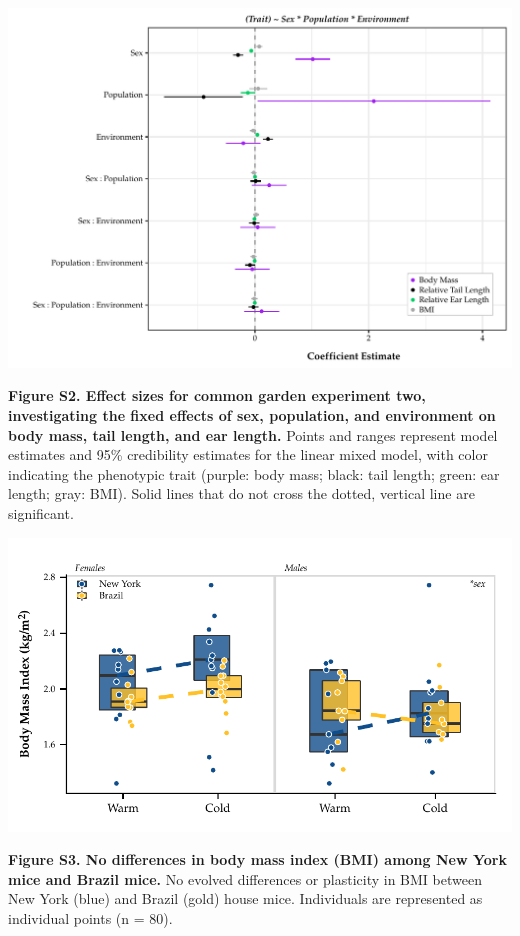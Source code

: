 \documentclass[]{article}
\begin{document}
\includegraphics{../results/figures/RXNsModel_relative.pdf}

\textbf{Figure S2. Effect sizes for common garden experiment two,
investigating the fixed effects of sex, population, and environment on
body mass, tail length, and ear length.} Points and ranges represent
model estimates and 95\% credibility estimates for the linear mixed
model, with color indicating the phenotypic trait (purple: body mass;
black: tail length; green: ear length; gray: BMI). Solid lines that do
not cross the dotted, vertical line are significant.

\newpage

\includegraphics{../results/figures/RXNs_BMI.pdf}

\textbf{Figure S3. No differences in body mass index (BMI) among New
York mice and Brazil mice.} No evolved differences or plasticity in BMI
between New York (blue) and Brazil (gold) house mice. Individuals are
represented as individual points (n = 80).
\end{document}
